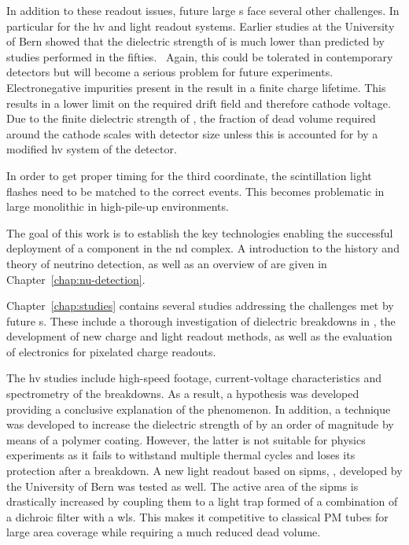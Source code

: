 In addition to these readout issues, future large \lartpc{}s face several other challenges.
In particular for the \gls{hv} and light readout systems.
Earlier studies at the University of Bern showed that the dielectric strength of \lar{} is much lower than predicted by studies performed in the fifties.~\cite{breakdown_14, swan1, swan2}
Again, this could be tolerated in contemporary detectors but will become a serious problem for future experiments.
Electronegative impurities present in the \lar{} result in a finite charge lifetime.
This results in a lower limit on the required drift field and therefore cathode voltage.
Due to the finite dielectric strength of \lar{}, the fraction of dead volume required around the cathode scales with detector size unless this is accounted for by a modified \gls{hv} system of the detector.

In order to get proper timing for the third coordinate, the scintillation light flashes need to be matched to the correct events.
This becomes problematic in large monolithic \lartpc{} in high-pile-up environments.

The goal of this work is to establish the key technologies enabling the successful deployment of a \lartpc{} component in the \dune{} \gls{nd} complex.
A introduction to the history and theory of neutrino detection, as well as an overview of \dune{} are given in Chapter~\ref{chap:nu-detection}.

Chapter~\ref{chap:studies} contains several studies addressing the challenges met by future \lartpc{}s.
These include a thorough investigation of dielectric breakdowns in \lar{}, the development of new charge and light readout methods, as well as the evaluation of electronics for pixelated charge readouts.

The \gls{hv} studies include high-speed footage, current-voltage characteristics and spectrometry of the breakdowns.
As a result, a hypothesis was developed providing a conclusive explanation of the phenomenon.
In addition, a technique was developed to increase the dielectric strength of \lar{} by an order of magnitude by means of a polymer coating.
However, the latter is not suitable for physics experiments as it fails to withstand multiple thermal cycles and loses its protection after a breakdown.
A new light readout based on \glspl{sipm}, \AL{}, developed by the University of Bern was tested as well.
The active area of the \glspl{sipm} is drastically increased by coupling them to a light trap formed of a combination of a dichroic filter with a \gls{wls}.
This makes it competitive to classical PM tubes for large area coverage while requiring a much reduced dead volume.

